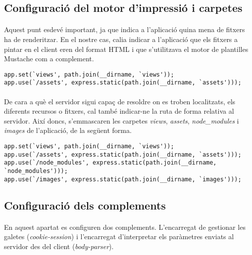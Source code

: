     \subsection{Configuració del motor d'impressió i carpetes}

    \paragraph{}
    Aquest punt esdevé important, ja que indica a l'aplicació quina mena de fitxers ha de renderitzar. En el nostre cas, calia indicar a l'aplicació que els fitxers a pintar en el client eren del format HTML i que s'utilitzava el motor de plantilles Mustache com a complement.

    \begin{lstlisting}[style=rawOwn,caption={Declaració del motor d'impressió}]
app.set(`views', path.join(__dirname, `views'));
app.use(`/assets', express.static(path.join(__dirname, `assets')));
    \end{lstlisting}

    \paragraph{}
    De cara a què el servidor sigui capaç de resoldre on es troben localitzats, els diferents recursos o fitxers, cal també indicar-ne la ruta de forma relativa al servidor. Així doncs, s'emmascaren les carpetes \emph{views}, \emph{assets}, \emph{node\_modules} i \emph{images} de l'aplicació, de la següent forma.

    \begin{lstlisting}[style=rawOwn,caption={Configuració de les rutes a les carpetes amb fitxers}]
app.set(`views', path.join(__dirname, `views'));
app.use(`/assets', express.static(path.join(__dirname, `assets')));
app.use(`/node_modules', express.static(path.join(__dirname, `node_modules')));
app.use(`/images', express.static(path.join(__dirname, `images')));
    \end{lstlisting}


    \subsection{Configuració dels complements}

    \paragraph{}
    En aquest apartat es configuren dos complements. L'encarregat de gestionar les galetes (\emph{cookie-session}) i l'encarregat d'interpretar els paràmetres enviats al servidor des del client (\emph{body-parser}).

